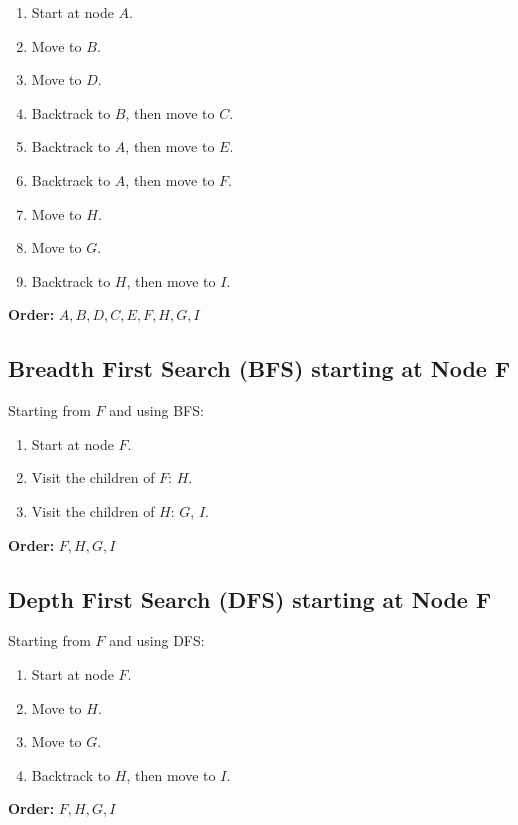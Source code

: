 \documentclass[10pt]{article}
\begin{document}
\begin{enumerate}
    \item Start at node \( A \).
    \item Move to \( B \).
    \item Move to \( D \).
    \item Backtrack to \( B \), then move to \( C \).
    \item Backtrack to \( A \), then move to \( E \).
    \item Backtrack to \( A \), then move to \( F \).
    \item Move to \( H \).
    \item Move to \( G \).
    \item Backtrack to \( H \), then move to \( I \).
\end{enumerate}

\textbf{Order:} \( A, B, D, C, E, F, H, G, I \)

\subsection{Breadth First Search (BFS) starting at Node F}

Starting from \( F \) and using BFS:

\begin{enumerate}
    \item Start at node \( F \).
    \item Visit the children of \( F \): \( H \).
    \item Visit the children of \( H \): \( G \), \( I \).
\end{enumerate}

\textbf{Order:} \( F, H, G, I \)

\subsection{Depth First Search (DFS) starting at Node F}

Starting from \( F \) and using DFS:

\begin{enumerate}
    \item Start at node \( F \).
    \item Move to \( H \).
    \item Move to \( G \).
    \item Backtrack to \( H \), then move to \( I \).
\end{enumerate}

\textbf{Order:} \( F, H, G, I \)
\newpage
\end{document}
